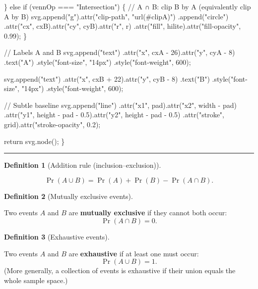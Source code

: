 \documentclass[
  letterpaper,
  DIV=11,
  numbers=noendperiod]{scrreprt}
\newenvironment{Shaded}{\begin{snugshade}}{\end{snugshade}}
\newcommand{\NormalTok}[1]{\textcolor[rgb]{0.00,0.23,0.31}{#1}}
\theoremstyle{definition}
\theoremstyle{plain}
\theoremstyle{definition}
\newtheorem{definition}{Definition}[chapter]
\theoremstyle{remark}
\begin{document}
\begin{Shaded}
\begin{Highlighting}[]
\NormalTok{  \} else if (vennOp === "Intersection") \{}
\NormalTok{    // A ∩ B: clip B by A (equivalently clip A by B)}
\NormalTok{    svg.append("g").attr("clip{-}path", "url(\#clipA)")}
\NormalTok{      .append("circle")}
\NormalTok{      .attr("cx", cxB).attr("cy", cyB).attr("r", r)}
\NormalTok{      .attr("fill", hilite).attr("fill{-}opacity", 0.99);}
\NormalTok{  \}}

\NormalTok{  // Labels A and B}
\NormalTok{  svg.append("text")}
\NormalTok{    .attr("x", cxA {-} 26).attr("y", cyA {-} 8)}
\NormalTok{    .text("A")}
\NormalTok{    .style("font{-}size", "14px")}
\NormalTok{    .style("font{-}weight", 600);}

\NormalTok{  svg.append("text")}
\NormalTok{    .attr("x", cxB + 22).attr("y", cyB {-} 8)}
\NormalTok{    .text("B")}
\NormalTok{    .style("font{-}size", "14px")}
\NormalTok{    .style("font{-}weight", 600);}

\NormalTok{  // Subtle baseline}
\NormalTok{  svg.append("line")}
\NormalTok{    .attr("x1", pad).attr("x2", width {-} pad)}
\NormalTok{    .attr("y1", height {-} pad {-} 0.5).attr("y2", height {-} pad {-} 0.5)}
\NormalTok{    .attr("stroke", grid).attr("stroke{-}opacity", 0.2);}

\NormalTok{  return svg.node();}
\NormalTok{\}}
\end{Highlighting}
\end{Shaded}

\begin{center}\rule{0.5\linewidth}{0.5pt}\end{center}

\begin{definition}[Addition rule
(inclusion--exclusion)]\protect\hypertarget{def-inclusion-exclusion}{}\label{def-inclusion-exclusion}

\[
\Pr(A \cup B) = \Pr(A) + \Pr(B) - \Pr(A \cap B).
\]

\end{definition}

\begin{definition}[Mutually exclusive
events]\protect\hypertarget{def-exclusive}{}\label{def-exclusive}

Two events \(A\) and \(B\) are \textbf{mutually exclusive} if they
cannot both occur: \[
\Pr(A \cap B) = 0.
\]

\end{definition}

\begin{definition}[Exhaustive
events]\protect\hypertarget{def-exhaustive}{}\label{def-exhaustive}

Two events \(A\) and \(B\) are \textbf{exhaustive} if at least one must
occur: \[
\Pr(A \cup B) = 1.
\] (More generally, a collection of events is exhaustive if their union
equals the whole sample space.)

\end{definition}
\end{document}
